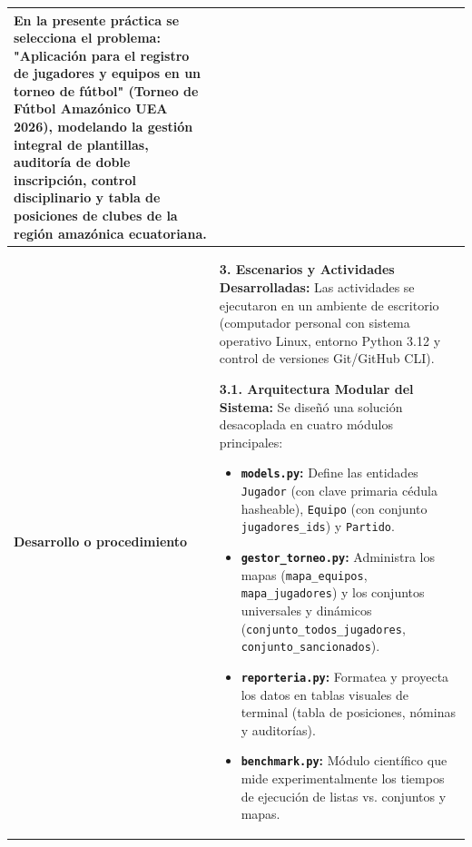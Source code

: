 \documentclass[11pt,a4paper]{article}
\begin{document}
\begin{longtable}{
    |>{\bfseries\centering\arraybackslash}p{3.2cm}|
    >{\setlength{\parindent}{0cm}\setstretch{1.12}}p{13.2cm}|
}
En la presente práctica se selecciona el problema: \textbf{"Aplicación para el registro de jugadores y equipos en un torneo de fútbol"} (Torneo de Fútbol Amazónico UEA 2026), modelando la gestión integral de plantillas, auditoría de doble inscripción, control disciplinario y tabla de posiciones de clubes de la región amazónica ecuatoriana.
\\

\hline


Desarrollo o procedimiento
&
\textbf{3. Escenarios y Actividades Desarrolladas:}\newline
Las actividades se ejecutaron en un ambiente de escritorio (computador personal con sistema operativo Linux, entorno Python 3.12 y control de versiones Git/GitHub CLI).

\textbf{3.1. Arquitectura Modular del Sistema:}\newline
Se diseñó una solución desacoplada en cuatro módulos principales:
\begin{itemize}
    \item \textbf{\texttt{models.py}:} Define las entidades \texttt{Jugador} (con clave primaria cédula hasheable), \texttt{Equipo} (con conjunto \texttt{jugadores\_ids}) y \texttt{Partido}.
    \item \textbf{\texttt{gestor\_torneo.py}:} Administra los mapas (\texttt{mapa\_equipos}, \texttt{mapa\_jugadores}) y los conjuntos universales y dinámicos (\texttt{conjunto\_todos\_jugadores}, \texttt{conjunto\_sancionados}).
    \item \textbf{\texttt{reporteria.py}:} Formatea y proyecta los datos en tablas visuales de terminal (tabla de posiciones, nóminas y auditorías).
    \item \textbf{\texttt{benchmark.py}:} Módulo científico que mide experimentalmente los tiempos de ejecución de listas vs. conjuntos y mapas.
\end{itemize}


\end{longtable}
\end{document}
